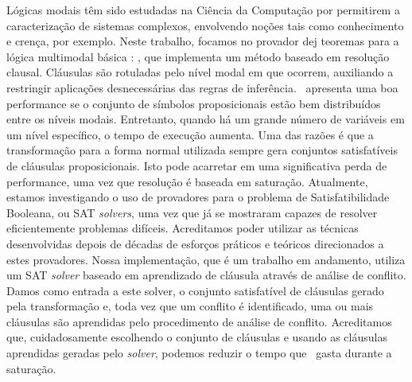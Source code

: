 Lógicas modais têm sido estudadas na Ciência da Computação por permitirem a
caracterização de sistemas complexos, envolvendo noções tais como
conhecimento e crença, por exemplo. Neste trabalho, focamos no provador dej
teoremas para a lógica multimodal básica : \ksp, que implementa
um método baseado em resolução clausal. Cláusulas são rotuladas pelo nível modal
em que ocorrem, auxiliando a restringir aplicações desnecessárias das regras de
inferência.
\ksp\ apresenta uma boa performance se o conjunto de símbolos proposicionais
estão bem distribuídos entre os níveis modais. Entretanto, quando há um grande
número de variáveis em um nível específico, o tempo de execução aumenta. Uma das
razões é que a transformação para a forma normal utilizada sempre gera conjuntos
satisfatíveis de cláusulas proposicionais. Isto pode acarretar em uma
significativa perda de performance, uma vez que resolução é baseada em
saturação. Atualmente, estamos investigando o uso de provadores para o problema
de Satisfatibilidade Booleana, ou SAT \emph{solvers}, uma vez que já se
mostraram capazes de resolver eficientemente problemas difíceis. Acreditamos
poder utilizar as técnicas desenvolvidas depois de décadas de esforços práticos
e teóricos direcionados a estes provadores.
Nossa implementação, que é um trabalho em andamento, utiliza um SAT
\emph{solver} baseado em aprendizado de cláusula através de análise de conflito.
Damos como entrada a este solver, o conjunto satisfatível de cláusulas gerado
pela transformação e, toda vez que um conflito é identificado, uma ou mais
cláusulas são aprendidas pelo procedimento de análise de conflito. Acreditamos
que, cuidadosamente escolhendo o conjunto de cláusulas e usando as cláusulas
aprendidas geradas pelo \emph{solver}, podemos reduzir o tempo que \ksp\ gasta
durante a saturação.
